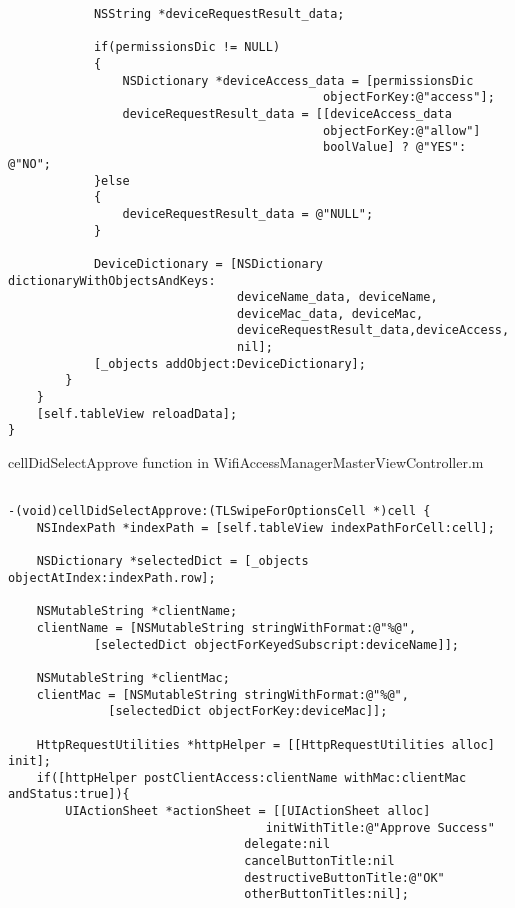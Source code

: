 \begin{appendices}
\begin{algorithm}[h]
\begin{verbatim}
            NSString *deviceRequestResult_data;
            
            if(permissionsDic != NULL)
            {
                NSDictionary *deviceAccess_data = [permissionsDic 
                							objectForKey:@"access"];
                deviceRequestResult_data = [[deviceAccess_data 
                							objectForKey:@"allow"] 
                							boolValue] ? @"YES": @"NO";
            }else
            {
                deviceRequestResult_data = @"NULL";
            }
            
            DeviceDictionary = [NSDictionary dictionaryWithObjectsAndKeys:
                                deviceName_data, deviceName,
                                deviceMac_data, deviceMac,
                                deviceRequestResult_data,deviceAccess,
                                nil];
            [_objects addObject:DeviceDictionary];
        }
    }
    [self.tableView reloadData];
}

 \end{verbatim}
\end{algorithm}

\begin{algorithm}[h]
  \caption{cellDidSelectApprove function in WifiAccessManagerMasterViewController.m}
  \label{code:ios_approve}
  \begin{verbatim}
  
-(void)cellDidSelectApprove:(TLSwipeForOptionsCell *)cell {
    NSIndexPath *indexPath = [self.tableView indexPathForCell:cell];
    
    NSDictionary *selectedDict = [_objects objectAtIndex:indexPath.row];
    
    NSMutableString *clientName;
    clientName = [NSMutableString stringWithFormat:@"%@",
            [selectedDict objectForKeyedSubscript:deviceName]];
    
    NSMutableString *clientMac;
    clientMac = [NSMutableString stringWithFormat:@"%@",
              [selectedDict objectForKey:deviceMac]];
    
    HttpRequestUtilities *httpHelper = [[HttpRequestUtilities alloc] init];
    if([httpHelper postClientAccess:clientName withMac:clientMac andStatus:true]){
        UIActionSheet *actionSheet = [[UIActionSheet alloc] 
        							initWithTitle:@"Approve Success"
                                 delegate:nil
                                 cancelButtonTitle:nil
                                 destructiveButtonTitle:@"OK"
                                 otherButtonTitles:nil];
        

\end{verbatim}
\end{algorithm}
\end{appendices}
